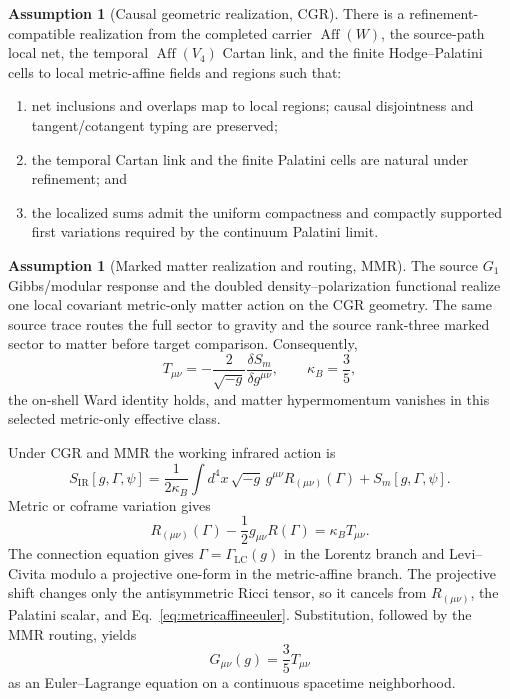 \documentclass[11pt]{article}
\theoremstyle{definition}
\newtheorem{assumption}[theorem]{Assumption}
\theoremstyle{remark}
\begin{document}
\begin{assumption}[Causal geometric realization, CGR]\label{ass:cgr}
There is a refinement-compatible realization from the completed carrier $\operatorname{Aff}(W)$, the source-path local net, the temporal $\operatorname{Aff}(V_4)$ Cartan link, and the finite Hodge--Palatini cells to local metric-affine fields and regions such that:
\begin{enumerate}[label=(\roman*)]
\item net inclusions and overlaps map to local regions; causal disjointness and tangent/cotangent typing are preserved;
\item the temporal Cartan link and the finite Palatini cells are natural under refinement; and
\item the localized sums admit the uniform compactness and compactly supported first variations required by the continuum Palatini limit.
\end{enumerate}
\end{assumption}

\begin{assumption}[Marked matter realization and routing, MMR]\label{ass:mmr}
The source $G_1$ Gibbs/modular response and the doubled density--polarization functional realize one local covariant metric-only matter action on the CGR geometry. The same source trace routes the full sector to gravity and the source rank-three marked sector to matter before target comparison. Consequently,
\begin{equation}\label{eq:matterstress}
 T_{\mu\nu}=-\frac{2}{\sqrt{-g}}\frac{\delta S_m}{\delta g^{\mu\nu}},
 \qquad \kappa_B=\frac35,
\end{equation}
the on-shell Ward identity holds, and matter hypermomentum vanishes in this selected metric-only effective class.
\end{assumption}

Under CGR and MMR the working infrared action is
\begin{equation}\label{eq:continuumaction}
 S_{\mathrm{IR}}[g,\Gamma,\psi]
 =\frac{1}{2\kappa_B}\int d^4x\,\sqrt{-g}\,
   g^{\mu\nu}R_{(\mu\nu)}(\Gamma)
 +S_m[g,\Gamma,\psi].
\end{equation}
Metric or coframe variation gives
\begin{equation}\label{eq:metricaffineeuler}
 R_{(\mu\nu)}(\Gamma)-\frac12g_{\mu\nu}R(\Gamma)
 =\kappa_B T_{\mu\nu}.
\end{equation}
The connection equation gives $\Gamma=\Gamma_{\mathrm{LC}}(g)$ in the Lorentz branch and Levi--Civita modulo a projective one-form in the metric-affine branch. The projective shift changes only the antisymmetric Ricci tensor, so it cancels from $R_{(\mu\nu)}$, the Palatini scalar, and Eq.~\eqref{eq:metricaffineeuler}. Substitution, followed by the MMR routing, yields
\begin{equation}\label{eq:continuumEinstein}
 \boxed{G_{\mu\nu}(g)=\frac35T_{\mu\nu}}
\end{equation}
as an Euler--Lagrange equation on a continuous spacetime neighborhood.
\end{document}
